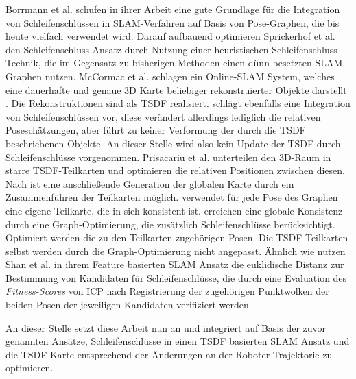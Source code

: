 Borrmann et al. \cite{borrmann2008globally} schufen in ihrer Arbeit eine gute Grundlage für die Integration von Schleifenschlüssen in SLAM-Verfahren auf Basis von Pose-Graphen, die bis heute vielfach verwendet wird.
Darauf aufbauend optimieren Sprickerhof et al. \cite{sprickerhof2011heuristic} den Schleifenschluss-Ansatz durch Nutzung einer heuristischen Schleifenschluss-Technik, die im Gegensatz zu bisherigen Methoden einen dünn besetzten SLAM-Graphen nutzen.
McCormac et al. \cite{mccormac2018fusion++} schlagen ein Online-SLAM System, welches eine dauerhafte und genaue 3D Karte beliebiger rekonstruierter Objekte darstellt \cite{mccormac2018fusion++}. Die Rekonstruktionen sind als TSDF realisiert. \cite{mccormac2018fusion++} schlägt ebenfalls eine Integration von Schleifenschlüssen vor, diese verändert allerdings lediglich die relativen Poseschätzungen, aber führt zu keiner Verformung der durch die TSDF beschriebenen Objekte. An dieser Stelle wird also kein Update der TSDF durch Schleifenschlüsse vorgenommen.
Prisacariu et al. \cite{prisacariu2017infinitam} unterteilen den 3D-Raum in starre TSDF-Teilkarten und optimieren die relativen Positionen zwischen diesen. Nach \cite{prisacariu2017infinitam} ist eine anschließende Generation der globalen Karte durch ein Zusammenführen der Teilkarten möglich. \cite{prisacariu2017infinitam} verwendet für jede Pose des Graphen eine eigene Teilkarte, die in sich konsistent ist. \cite{prisacariu2017infinitam} erreichen eine globale Konsistenz durch eine Graph-Optimierung, die zusätzlich Schleifenschlüsse berücksichtigt. Optimiert werden die zu den Teilkarten zugehörigen Posen. Die TSDF-Teilkarten selbst werden durch die Graph-Optimierung nicht angepasst.
Ähnlich wie \cite{borrmann2008globally} nutzen Shan et al. \cite{shan2020lio} in ihrem Feature basierten SLAM Ansatz die euklidische Distanz zur Bestimmung von Kandidaten für Schleifenschlüsse, die durch eine Evaluation des \emph{Fitness-Scores} von ICP nach Registrierung der zugehörigen Punktwolken der beiden Posen der jeweiligen Kandidaten verifiziert werden.

An dieser Stelle setzt diese Arbeit nun an und integriert auf Basis der zuvor genannten Ansätze, Schleifenschlüsse in einen TSDF basierten SLAM Ansatz und die TSDF Karte entsprechend der Änderungen an der Roboter-Trajektorie zu optimieren.





